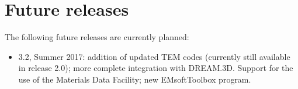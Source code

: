 \documentclass[DIV=calc, paper=letter, fontsize=11pt]{scrartcl}	 %
\begin{document}
\section{Future releases}
The following future releases are currently planned:
\begin{itemize}
	\item 3.2, Summer 2017: addition of updated TEM codes (currently still available in release 2.0); more complete integration with DREAM.3D.
	Support for the use of the Materials Data Facility; new EMsoftToolbox program.
\end{itemize}
\end{document}
